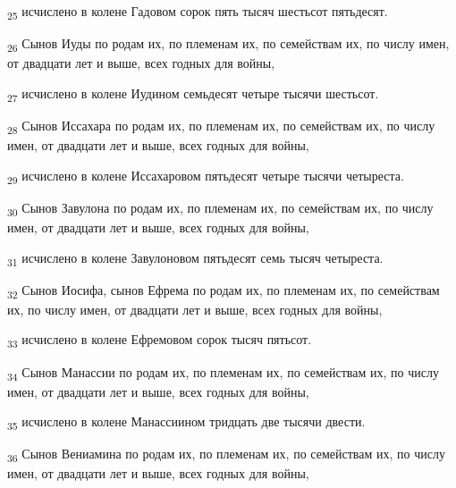 \begin{tcolorbox}
\textsubscript{25} исчислено в колене Гадовом сорок пять тысяч шестьсот пятьдесят.
\end{tcolorbox}
\begin{tcolorbox}
\textsubscript{26} Сынов Иуды по родам их, по племенам их, по семействам их, по числу имен, от двадцати лет и выше, всех годных для войны,
\end{tcolorbox}
\begin{tcolorbox}
\textsubscript{27} исчислено в колене Иудином семьдесят четыре тысячи шестьсот.
\end{tcolorbox}
\begin{tcolorbox}
\textsubscript{28} Сынов Иссахара по родам их, по племенам их, по семействам их, по числу имен, от двадцати лет и выше, всех годных для войны,
\end{tcolorbox}
\begin{tcolorbox}
\textsubscript{29} исчислено в колене Иссахаровом пятьдесят четыре тысячи четыреста.
\end{tcolorbox}
\begin{tcolorbox}
\textsubscript{30} Сынов Завулона по родам их, по племенам их, по семействам их, по числу имен, от двадцати лет и выше, всех годных для войны,
\end{tcolorbox}
\begin{tcolorbox}
\textsubscript{31} исчислено в колене Завулоновом пятьдесят семь тысяч четыреста.
\end{tcolorbox}
\begin{tcolorbox}
\textsubscript{32} Сынов Иосифа, сынов Ефрема по родам их, по племенам их, по семействам их, по числу имен, от двадцати лет и выше, всех годных для войны,
\end{tcolorbox}
\begin{tcolorbox}
\textsubscript{33} исчислено в колене Ефремовом сорок тысяч пятьсот.
\end{tcolorbox}
\begin{tcolorbox}
\textsubscript{34} Сынов Манассии по родам их, по племенам их, по семействам их, по числу имен, от двадцати лет и выше, всех годных для войны,
\end{tcolorbox}
\begin{tcolorbox}
\textsubscript{35} исчислено в колене Манассиином тридцать две тысячи двести.
\end{tcolorbox}
\begin{tcolorbox}
\textsubscript{36} Сынов Вениамина по родам их, по племенам их, по семействам их, по числу имен, от двадцати лет и выше, всех годных для войны,
\end{tcolorbox}
